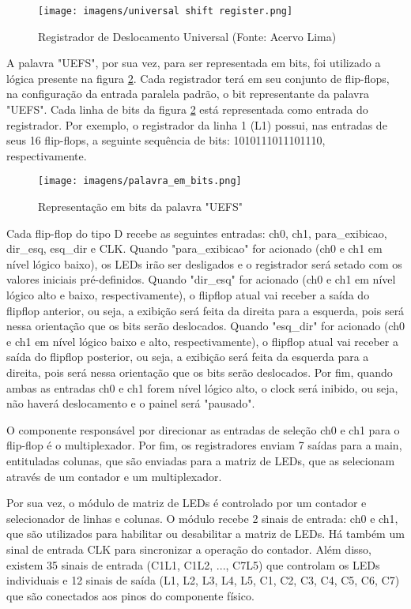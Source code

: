 \begin{figure}[!h]
    \centering
    \texttt{[image: imagens/universal shift register.png]}
    \caption{Registrador de Deslocamento Universal (Fonte: Acervo Lima)}
    \label{fig:universal_sr}
\end{figure}

A palavra "UEFS", por sua vez, para ser representada em bits, foi utilizado a lógica presente na figura \ref{fig:uefs_em_bits}. Cada registrador terá em seu conjunto de flip-flops, na configuração da entrada paralela padrão, o bit representante da palavra "UEFS". Cada linha de bits da figura \ref{fig:uefs_em_bits} está representada como entrada do registrador. Por exemplo, o registrador da linha 1 (L1) possui, nas entradas de seus 16 flip-flops, a seguinte sequência de bits: 1010111011101110, respectivamente. 

\begin{figure}[!h]
    \centering
    \texttt{[image: imagens/palavra\_em\_bits.png]}
    \caption{Representação em bits da palavra "UEFS"}
    \label{fig:uefs_em_bits}
\end{figure}

Cada flip-flop do tipo D recebe as seguintes entradas: ch0, ch1, para\_exibicao, dir\_esq, esq\_dir e CLK. Quando "para\_exibicao" for acionado (ch0 e ch1 em nível lógico baixo), os LEDs irão ser desligados e o registrador será setado com os valores iniciais pré-definidos. Quando "dir\_esq" for acionado (ch0 e ch1 em nível lógico alto e baixo, respectivamente), o flipflop atual vai receber a saída do flipflop anterior, ou seja, a exibição será feita da direita para a esquerda, pois será nessa orientação que os bits serão deslocados. Quando "esq\_dir" for acionado (ch0 e ch1 em nível lógico baixo e alto, respectivamente), o flipflop atual vai receber a saída do flipflop posterior, ou seja, a exibição será feita da esquerda para a direita, pois será nessa orientação que os bits serão deslocados. Por fim, quando ambas as entradas ch0 e ch1 forem nível lógico alto, o clock será inibido, ou seja, não haverá deslocamento e o painel será "pausado". 

O componente responsável por direcionar as entradas de seleção ch0 e ch1 para o flip-flop é o multiplexador. Por fim, os registradores enviam 7 saídas para a main, entituladas colunas, que são enviadas para a matriz de LEDs, que as selecionam através de um contador e um multiplexador.

Por sua vez, o módulo de matriz de LEDs é controlado por um contador e selecionador de linhas e colunas. O módulo recebe 2 sinais de entrada: ch0 e ch1, que são utilizados para habilitar ou desabilitar a matriz de LEDs. Há também um sinal de entrada CLK para sincronizar a operação do contador. Além disso, existem 35 sinais de entrada (C1L1, C1L2, ..., C7L5) que controlam os LEDs individuais e 12 sinais de saída (L1, L2, L3, L4, L5, C1, C2, C3, C4, C5, C6, C7) que são conectados aos pinos do componente físico.

